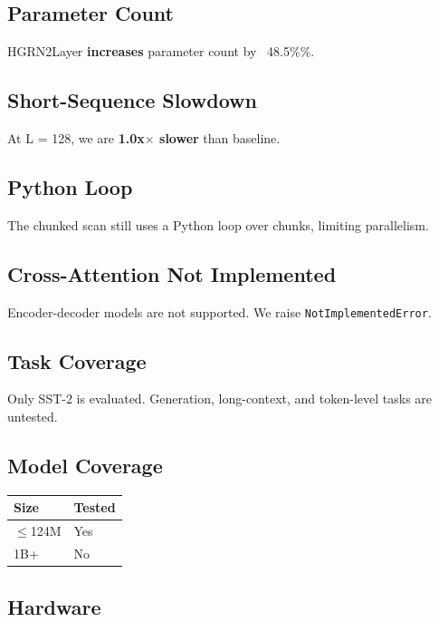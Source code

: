 \subsection{Parameter Count}

HGRN2Layer \textbf{increases} parameter count by ~48.5\%\%.

\subsection{Short-Sequence Slowdown}

At L = 128, we are \textbf{1.0x$\times$ slower} than baseline.

\subsection{Python Loop}

The chunked scan still uses a Python loop over chunks, limiting parallelism.

\subsection{Cross-Attention Not Implemented}

Encoder-decoder models are not supported. We raise \texttt{NotImplementedError}.

\subsection{Task Coverage}

Only SST-2 is evaluated. Generation, long-context, and token-level tasks 
are untested.

\subsection{Model Coverage}

\begin{table}[H]
\centering
\small
\begin{tabular}{ll}
\toprule
\textbf{Size} & \textbf{Tested} \\
\midrule
$\le$124M & Yes \\
1B+ & No \\
\bottomrule
\end{tabular}
\end{table}

\subsection{Hardware}

